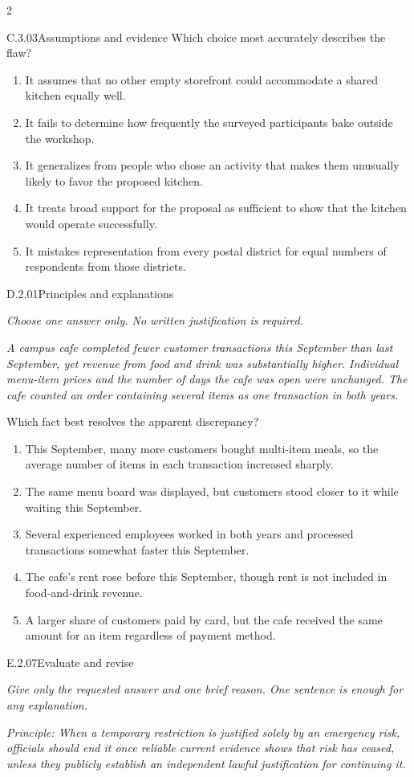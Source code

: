 \documentclass[9pt]{extarticle}
\newcommand{\choice}[1]{\item #1}
\begin{document}
\begin{multicols}{2}
\begin{DenseCoreProblem}{C.3.03}{Assumptions and evidence}
Which choice most accurately describes the flaw?
\begin{enumerate}[label=(\alph*)]
  \choice{It assumes that no other empty storefront could accommodate a shared kitchen equally well.}
  \choice{It fails to determine how frequently the surveyed participants bake outside the workshop.}
  \choice{It generalizes from people who chose an activity that makes them unusually likely to favor the proposed kitchen.}
  \choice{It treats broad support for the proposal as sufficient to show that the kitchen would operate successfully.}
  \choice{It mistakes representation from every postal district for equal numbers of respondents from those districts.}
\end{enumerate}
\end{DenseCoreProblem}
\begin{DenseCoreProblem}{D.2.01}{Principles and explanations}
{\scriptsize\textit{Choose one answer only. No written justification is required.}\par}
\emph{A campus cafe completed fewer customer transactions this September than last September, yet revenue from food and drink was substantially higher. Individual menu-item prices and the number of days the cafe was open were unchanged. The cafe counted an order containing several items as one transaction in both years.}

Which fact best resolves the apparent discrepancy?
\begin{enumerate}[label=(\alph*)]
  \choice{This September, many more customers bought multi-item meals, so the average number of items in each transaction increased sharply.}
  \choice{The same menu board was displayed, but customers stood closer to it while waiting this September.}
  \choice{Several experienced employees worked in both years and processed transactions somewhat faster this September.}
  \choice{The cafe's rent rose before this September, though rent is not included in food-and-drink revenue.}
  \choice{A larger share of customers paid by card, but the cafe received the same amount for an item regardless of payment method.}
\end{enumerate}
\end{DenseCoreProblem}
\begin{DenseCoreProblem}{E.2.07}{Evaluate and revise}
{\scriptsize\textit{Give only the requested answer and one brief reason. One sentence is enough for any explanation.}\par}
\emph{Principle: When a temporary restriction is justified solely by an emergency risk, officials should end it once reliable current evidence shows that risk has ceased, unless they publicly establish an independent lawful justification for continuing it.}


\end{DenseCoreProblem}
\end{multicols}
\end{document}
